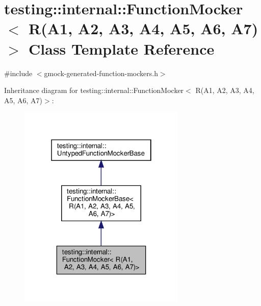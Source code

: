 \hypertarget{classtesting_1_1internal_1_1_function_mocker_3_01_r_07_a1_00_01_a2_00_01_a3_00_01_a4_00_01_a5_00_01_a6_00_01_a7_08_4}{}\section{testing\+:\+:internal\+:\+:Function\+Mocker$<$ R(A1, A2, A3, A4, A5, A6, A7)$>$ Class Template Reference}
\label{classtesting_1_1internal_1_1_function_mocker_3_01_r_07_a1_00_01_a2_00_01_a3_00_01_a4_00_01_a5_00_01_a6_00_01_a7_08_4}


{\ttfamily \#include $<$gmock-\/generated-\/function-\/mockers.\+h$>$}



Inheritance diagram for testing\+:\+:internal\+:\+:Function\+Mocker$<$ R(A1, A2, A3, A4, A5, A6, A7)$>$\+:
\nopagebreak
\begin{figure}[H]
\begin{center}
\leavevmode
\includegraphics[width=226pt]{classtesting_1_1internal_1_1_function_mocker_3_01_r_07_a1_00_01_a2_00_01_a3_00_01_a4_00_01_a5_008d5372eb9fbc6c0c339fc18cce8f7265}
\end{center}
\end{figure}



